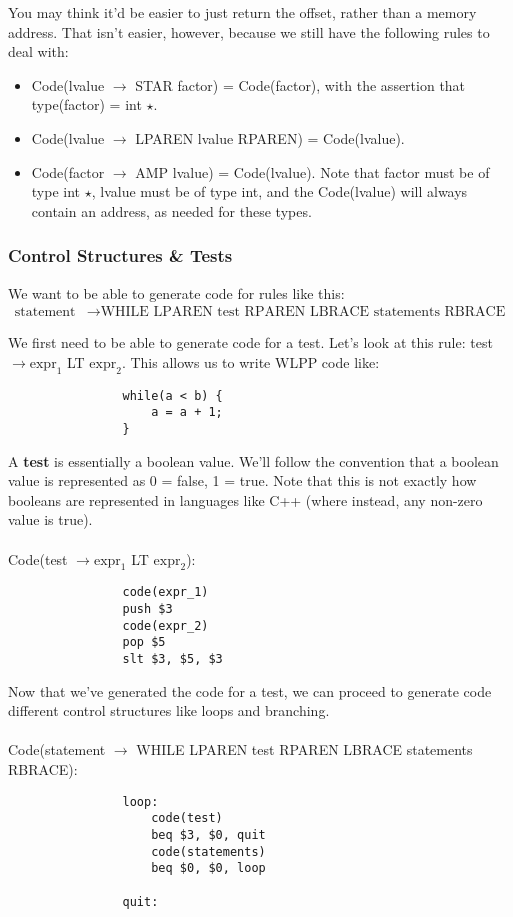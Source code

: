 \documentclass[]{article}
\theoremstyle{definition}
\newcommand{\lecture}[1]{\marginpar{{\footnotesize $\leftarrow$ \underline{#1}}}}
\begin{document}
				You may think it'd be easier to just return the offset, rather than a memory address. That isn't easier, however, because we still have the following rules to deal with:
				\begin{itemize}
					\item Code(lvalue $\to$ STAR factor) = Code(factor), with the assertion that type(factor) = int $\star$.
					\item Code(lvalue $\to$ LPAREN lvalue RPAREN) = Code(lvalue).
					\item Code(factor $\to$ AMP lvalue) = Code(lvalue). Note that factor must be of type int $\star$, lvalue must be of type int, and the Code(lvalue) will always contain an address, as needed for these types.
				\end{itemize}

			\subsubsection{Control Structures \& Tests} \lecture{March 22, 2013}
				We want to be able to generate code for rules like this:
				\begin{align*}
					\text{statement} &\to \text{WHILE LPAREN test RPAREN LBRACE statements RBRACE}
				\end{align*}

				We first need to be able to generate code for a test. Let's look at this rule: test $\to \text{expr}_1$ LT $\text{expr}_2$. This allows us to write WLPP code like:
				\begin{verbatim}
				while(a < b) {
					a = a + 1;
				}
				\end{verbatim}

				A \textbf{test} is essentially a boolean value. We'll follow the convention that a boolean value is represented as 0 = false, 1 = true. Note that this is not exactly how booleans are represented in languages like C++ (where instead, any non-zero value is true).
				\\ \\
				Code(test $\to \text{expr}_1$ LT $\text{expr}_2$):
				\begin{verbatim}
				code(expr_1)
				push $3
				code(expr_2)
				pop $5
				slt $3, $5, $3
				\end{verbatim}

				Now that we've generated the code for a test, we can proceed to generate code different control structures like loops and branching.
				\\ \\
				Code(statement $\to$ WHILE LPAREN test RPAREN LBRACE statements RBRACE):
				\begin{verbatim}
				loop:
				    code(test)
				    beq $3, $0, quit
				    code(statements)
				    beq $0, $0, loop

				quit:
				\end{verbatim}
\end{document}

